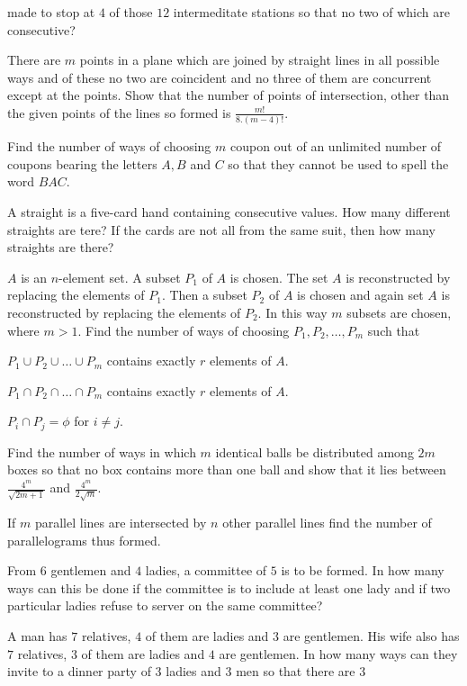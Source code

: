   made to stop at $4$ of those $12$ intermeditate stations so that no two of which are consecutive?
\item There are $m$ points in a plane which are joined by straight lines in all possible ways and of these no two are coincident
  and no three of them are concurrent except at the points. Show that the number of points of intersection, other than the given
  points of the lines so formed is $\frac{m!}{8.(m - 4)!}$.
\item Find the number of ways of choosing $m$ coupon out of an unlimited number of coupons bearing the letters $A, B$ and $C$ so
  that they cannot be used to spell the word $BAC$.
\item A straight is a five-card hand containing consecutive values. How many different straights are tere? If the cards are not all
  from the same suit, then how many straights are there?
\item $A$ is an $n$-element set. A subset $P_1$ of $A$ is chosen. The set $A$ is reconstructed by replacing the elements of
  $P_1$. Then a subset $P_2$ of $A$ is chosen and again set $A$ is reconstructed by replacing the elements of $P_2$. In this way
  $m$ subsets are chosen, where $m > 1$. Find the number of ways of choosing $P_1, P_2, \ldots, P_m$ such that
  \startitemize[i]
  \item $P_1\cup P_2\cup \ldots \cup P_m$ contains exactly $r$ elements of $A$.
  \item $P_1\cap P_2\cap \ldots \cap P_m$ contains exactly $r$ elements of $A$.
  \item $P_i\cap P_j=\phi$ for $i\neq j$.
  \stopitemize
\item Find the number of ways in which $m$ identical balls be distributed among $2m$ boxes so that no box contains more than one
  ball and show that it lies between $\frac{4^m}{\sqrt{2m + 1}}$ and $\frac{4^m}{2\sqrt{m}}$.
\item If $m$ parallel lines are intersected by $n$ other parallel lines find the number of parallelograms
  thus formed.
\item From $6$ gentlemen and $4$ ladies, a committee of $5$ is to be formed. In how many ways can this be done if the committee is
  to include at least one lady and if two particular ladies refuse to server on the same committee?
\item A man has $7$ relatives, $4$ of them are ladies and $3$ are gentlemen. His wife also has $7$ relatives, $3$ of them are
  ladies and $4$ are gentlemen. In how many ways can they invite to a dinner party of $3$ ladies and $3$ men so that there are $3$
